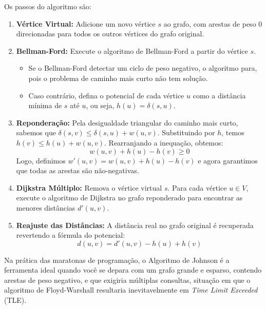 Os passos do algoritmo são:
\begin{enumerate}
    \item \textbf{Vértice Virtual:} Adicione um novo vértice $s$ ao grafo, com arestas de peso $0$ direcionadas para todos os outros vértices do grafo original.
    \item \textbf{Bellman-Ford:} Execute o algoritmo de Bellman-Ford a partir do vértice $s$. 
    \begin{itemize}
        \item Se o Bellman-Ford detectar um ciclo de peso negativo, o algoritmo para, pois o problema de caminho mais curto não tem solução.
        \item Caso contrário, defina o potencial de cada vértice $u$ como a distância mínima de $s$ até $u$, ou seja, $h(u) = \delta(s, u)$.
    \end{itemize}
    \item \textbf{Reponderação:} Pela desigualdade triangular do caminho mais curto, sabemos que $\delta(s, v) \le \delta(s, u) + w(u, v)$. Substituindo por $h$, temos $h(v) \le h(u) + w(u, v)$. Rearranjando a inequação, obtemos:
    $$w(u, v) + h(u) - h(v) \ge 0$$
    Logo, definimos $w'(u, v) = w(u, v) + h(u) - h(v)$ e agora garantimos que todas as arestas são não-negativas.
    \item \textbf{Dijkstra Múltiplo:} Remova o vértice virtual $s$. Para cada vértice $u \in V$, execute o algoritmo de Dijkstra no grafo reponderado para encontrar as menores distâncias $d'(u, v)$.
    \item \textbf{Reajuste das Distâncias:} A distância real no grafo original é recuperada revertendo a fórmula do potencial:
    $$d(u, v) = d'(u, v) - h(u) + h(v)$$
\end{enumerate}

Na prática das maratonas de programação, o Algoritmo de Johnson é a ferramenta ideal quando você se depara com um grafo grande e esparso, contendo arestas de peso negativo, e que exigiria múltiplas consultas, situação em que o algoritmo de Floyd-Warshall resultaria inevitavelmente em \textit{Time Limit Exceeded} (TLE).
